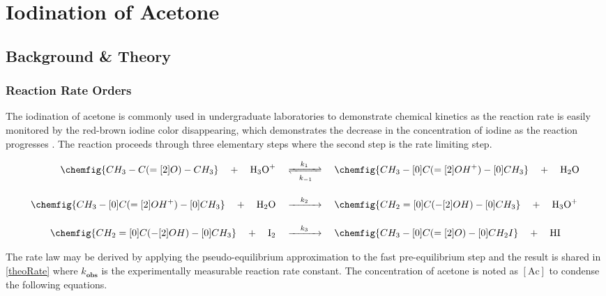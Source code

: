 \documentclass{article}
\begin{document}
\section{Iodination of Acetone}
\subsection{Background \& Theory}
\subsubsection{Reaction Rate Orders}

The iodination of acetone is commonly used in undergraduate laboratories to demonstrate chemical kinetics as the reaction rate is easily monitored by the red-brown iodine color disappearing, which demonstrates the decrease in the concentration of iodine as the reaction progresses \autocite{birk_three_1992}. The reaction proceeds through three elementary steps where the second step is the rate limiting step.


\begin{align}
    \chemfig{CH_3-C(=[2]O)-CH_3} \quad + \quad \ce{H3O+} \quad
    &\xrightleftharpoons[k_{-1}]{\quad k_1 \quad} \quad
    \chemfig{CH_3-[0]C(=[2]OH^{+})-[0]CH_3} \quad + \quad \ce{H2O}
    \\[1em]
    \chemfig{CH_3-[0]C(=[2]OH^{+})-[0]CH_3} \quad + \quad \ce{H2O} \quad
    &\xrightarrow{\quad k_2 \quad} \quad
    \chemfig{CH_2=[0]C(-[2]OH)-[0]CH_3} \quad + \quad \ce{H3O+}
    \\[1em]
    \chemfig{CH_2=[0]C(-[2]OH)-[0]CH_3} \quad + \quad \ce{I2} \quad
    &\xrightarrow{\quad k_3 \quad} \quad
    \chemfig{CH_3-[0]C(=[2]O)-[0]CH_2I} \quad + \quad \ce{HI} \label{mechanism}
\end{align}
\setcounter{equation}{0}
\vspace{1em}


The rate law may be derived by applying the pseudo-equilibrium approximation to the fast pre-equilibrium step  \autocite{dongxia} and the result is shared in \cref{theoRate} where $k_\textbf{obs}$ is the experimentally measurable reaction rate constant. The concentration of acetone is noted as $[\mathrm{Ac}]$ to condense the following equations.
\end{document}
